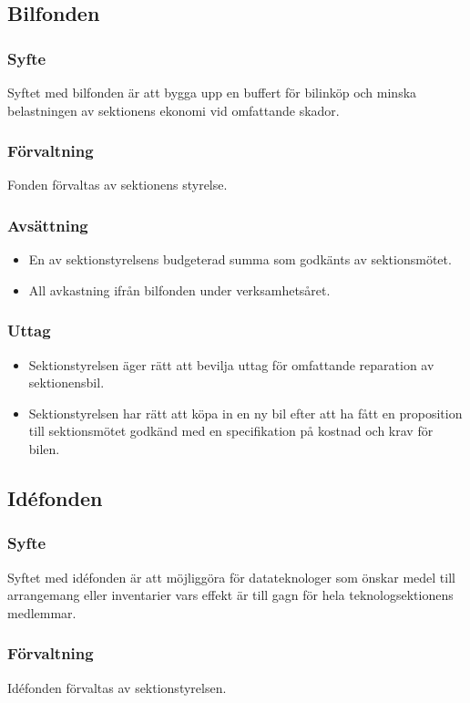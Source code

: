\documentclass[a4paper]{dtek}
\begin{document}
\subsection{Bilfonden}
\subsubsection{Syfte}
\label{sec:bilfond_syfte}
Syftet med bilfonden är att bygga upp en buffert för bilinköp och minska belastningen av sektionens ekonomi vid omfattande skador.
\subsubsection{Förvaltning}
Fonden förvaltas av sektionens styrelse.
\subsubsection{Avsättning}
\begin{itemize}
\item En av sektionstyrelsens budgeterad summa som godkänts av sektionsmötet.
\item All avkastning ifrån bilfonden under verksamhetsåret.
\end{itemize}
\subsubsection{Uttag}
\begin{itemize}
    \item Sektionstyrelsen äger rätt att bevilja uttag för omfattande reparation av sektionensbil.
    \item Sektionstyrelsen har rätt att köpa in en ny bil efter att ha fått en proposition till sektionsmötet godkänd med en specifikation på kostnad och krav för bilen.
\end{itemize}

\subsection{Idéfonden}
\subsubsection{Syfte}
\label{sec:idefond_syfte}
Syftet med idéfonden är att möjliggöra för datateknologer som önskar medel till arrangemang eller inventarier vars effekt är till gagn för hela teknologsektionens medlemmar.
\subsubsection{Förvaltning}
Idéfonden förvaltas av sektionstyrelsen.
\end{document}
